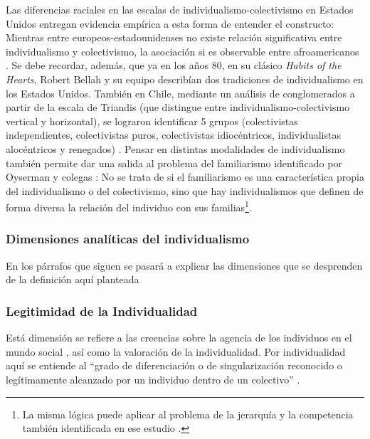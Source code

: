 \documentclass[12pt,twoside]{templates/facsothesis}
\begin{document}
Las diferencias raciales en las escalas de individualismo-colectivismo en Estados Unidos \citep{oyserman2002, komarraju2008} entregan evidencia empírica a esta forma de entender el constructo: Mientras entre europeos-estadounidenses no existe relación significativa entre individualismo y colectivismo, la asociación si es observable entre afroamericanos \citep{komarraju2008}. Se debe recordar, además, que ya en los años 80, en su clásico \emph{Habits of the Hearts}, Robert Bellah y su equipo describían dos tradiciones de individualismo en los Estados Unidos. También en Chile, mediante un análisis de conglomerados a partir de la escala de Triandis (que distingue entre individualismo-colectivismo vertical y horizontal), se lograron identificar 5 grupos (colectivistas independientes, colectivistas puros, colectivistas idiocéntricos, individualistas alocéntricos y renegados) \citep{rojas2008}. Pensar en distintas modalidades de individualismo también permite dar una salida al problema del familiarismo identificado por Oyserman y colegas \citeyearpar{oyserman2002} : No se trata de si el familiarismo es una característica propia del individualismo o del colectivismo, sino que hay individualismos que definen de forma diversa la relación del individuo con sus familias\footnote{La misma lógica puede aplicar al problema de la jerarquía y la competencia también identificada en ese estudio \citep{oyserman2002}.}.

\hypertarget{dimensiones-analuxedticas-del-individualismo}{%
\subsubsection{Dimensiones analíticas del individualismo}\label{dimensiones-analuxedticas-del-individualismo}}

En los párrafos que siguen se pasará a explicar las dimensiones que se desprenden de la definición aquí planteada

\hypertarget{legitimidad-de-la-individualidad}{%
\subsubsection{Legitimidad de la Individualidad}\label{legitimidad-de-la-individualidad}}

Está dimensión se refiere a las creencias sobre la agencia de los individuos en el mundo social \citep{brewer2007}, así como la valoración de la individualidad. Por individualidad aquí se entiende al ``grado de diferenciación o de singularización reconocido o legítimamente alcanzado por un individuo dentro de un colectivo'' \citep[p.~10]{martuccelli2018}.
\end{document}
